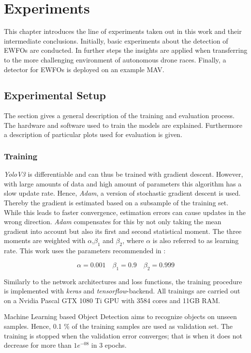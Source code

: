 \chapter{Experiments}

This chapter introduces the line of experiments taken out in this work and their intermediate conclusions. Initially, basic experiments about the detection of \acp{EWFO} are conducted. In further steps the insights are applied when transferring to the more challenging environment of autonomous drone races. Finally, a detector for \acp{EWFO} is deployed on an example \ac{MAV}.

\section{Experimental Setup}

The section gives a general description of the training and evaluation process. The hardware and software used to train the models are explained. Furthermore a description of particular plots used for evaluation is given.

\subsection{Training}

\textit{YoloV3} is differentiable and can thus be trained with gradient descent. However, with large amounts of data and high amount of parameters this algorithm has a slow update rate. Hence, \textit{Adam}\cite{Kingma2014}, a version of stochastic gradient descent is used. Thereby the gradient is estimated based on a subsample of the training set. While this leads to faster convergence, estimation errors can cause updates in the wrong direction. \textit{Adam} compensates for this by not only taking the mean gradient into account but also its first and second statistical moment. The three moments are weighted with $\alpha$,$\beta_1$ and $\beta_2$, where $\alpha$ is also referred to as learning rate. This work uses the parameters recommended in \cite{Kingma2014}:

$$\alpha=0.001 \quad \beta_1=0.9 \quad \beta_2=0.999$$

Similarly to the network architectures and loss functions, the training procedure is implemented with \textit{keras} and \textit{tensorflow}-backend. All trainings are carried out on a Nvidia Pascal GTX 1080 Ti GPU with 3584 cores and 11GB RAM.

Machine Learning based Object Detection aims to recognize objects on unseen samples. Hence, 0.1 \% of the training samples are used as validation set. The training is stopped when the validation error converges; that is when it does not decrease for more than $1e^{-08}$ in 3 epochs.


